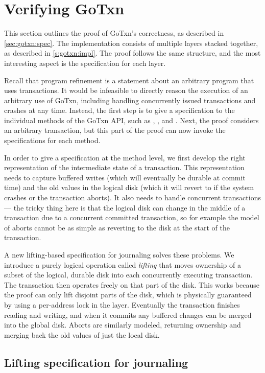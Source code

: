 \section{Verifying GoTxn}
\label{s:proof}

This section outlines the proof of GoTxn's correctness, as described in
\cref{sec:gotxn:spec}. The implementation consists of multiple layers stacked
together, as described in \cref{s:gotxn:impl}. The proof follows the same
structure, and the most interesting aspect is the specification for each layer.

Recall that program refinement is a statement about an arbitrary program that
uses transactions. It would be infeasible to directly reason the execution of an
arbitrary use of GoTxn, including handling concurrently issued transactions and
crashes at any time. Instead, the first step is to give a specification to the
individual methods of the GoTxn API, such as , , and
. Next, the proof considers an arbitrary transaction, but this part
of the proof can now invoke the specifications for each method.

In order to give a specification at the method level, we first
develop the right representation of the intermediate state of a transaction.
This representation needs to capture buffered writes (which will eventually be
durable at commit time) and the old values in the logical disk (which it will
revert to if the system crashes or the transaction aborts). It also needs to
handle concurrent transactions --- the tricky thing here is that the logical
disk can change in the middle of a transaction due to a concurrent committed
transaction, so for example the model of aborts cannot be as simple as reverting
to the disk at the start of the transaction.

A new lifting-based specification for journaling solves these problems. We
introduce a purely logical operation called \emph{lifting} that moves ownership
of a subset of the logical, durable disk into each concurrently executing
transaction. The transaction then operates freely on that part of the disk. This
works because the proof can only lift disjoint parts of the disk, which is
physically guaranteed by using a per-address lock in the  layer.
Eventually the transaction finishes reading and writing, and when it commits any
buffered changes can be merged into the global disk. Aborts are similarly
modeled, returning ownership and merging back the old values of just the local
disk.

\subsection{Lifting specification for journaling}
\label{sec:txn:lifting}

